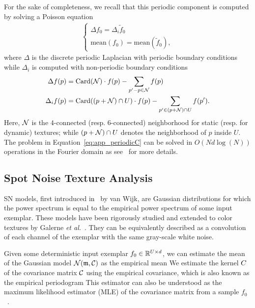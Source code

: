 For the sake of completeness, we recall that this periodic component is computed by solving a Poisson equation
\begin{align}
\left\{
\begin{array}{ll}
 \Delta f_0 = \Delta_i \tilde f_0 \\
 \textrm{mean}(f_0) = \textrm{mean}(\tilde f_0),
\end{array}
\right.
\label{eq:app_periodicC}
\end{align}
where $\Delta$ is the discrete periodic Laplacian with periodic boundary conditions while
$\Delta_i$ is computed with non-periodic boundary conditions
\begin{align*}
	\Delta f(p) & = \textrm{Card}(\mathcal{N}) \cdot f(p) - \sum_{p'-p \in \mathcal{N}} f(p) \\
	\Delta_i f(p) & = \textrm{Card}((p+\mathcal{N}) \cap U) \cdot f(p) - \sum_{p' \in (p+\mathcal{N}) \cap U} f(p').
\end{align*}
Here, $\mathcal{N}$ is the $4$-connected (resp. $6$-connected) neighborhood for static (resp. for dynamic) textures; while $(p+\mathcal{N}) \cap U$ denotes the neighborhood of $p$ inside $U$. The problem in Equation~\eqref{eq:app_periodicC} can be solved in $O(Nd\log(N))$ operations in the Fourier domain as
see~\cite{Moisan11} for more details.



\subsection{Spot Noise Texture Analysis}

SN models, first introduced in~\cite{Wijk1991} by van Wijk, are Gaussian distributions for which the power spectrum is equal to the empirical power spectrum of some input exemplar. These models have been rigorously studied and extended to color textures by Galerne \emph{et al.}~\cite{galerne-ieee}. They can be equivalently described as a convolution of each channel of the exemplar with the same gray-scale white noise.

Given some deterministic input exemplar $f_0 \in \mathbb{R}^{U \times d}$, we can estimate the mean of the Gaussian model $\mathcal{N}({\frak m},\mathcal{C})$ as the empirical mean
We estimate the kernel $C$ of the covariance matrix $\mathcal{C}$ using the empirical
covariance, which is also known as the empirical periodogram
This estimator can also be understood as the maximum likelihood estimator (MLE) of the covariance matrix from a sample $f_0$~\cite{Mardia-Book}.


